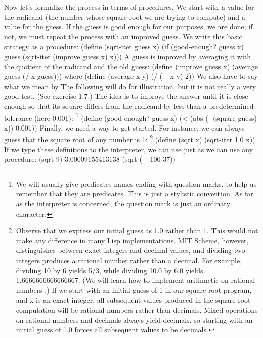 Now let's formalize the process in terms of procedures.
We start with a value for the radicand
(the number whose square root we are trying to compute)
and a value for the guess.
If the guess is good enough for our purposes, we are done;
if not, we must repeat the process with an improved guess.
We write this basic strategy as a procedure:
\startcode
(define (sqrt-iter guess x)
  (if (good-enough? guess x)
      guess
      (sqrt-iter (improve guess x)
                 x)))
\stopcode
A guess is improved by averaging it with the quotient of the radicand and the old guess:
\startcode
(define (improve guess x)
  (average guess (/ x guess)))
\stopcode
where
\startcode
(define (average x y)
  (/ (+ x y) 2))
\stopcode
We also have to say what we mean by 
The following will do for illustration,
but it is not really a very good test.
(See exercise 1.7.)
The idea is to improve the answer until it is close enough
so that its square differs from the radicand by less than a predetermined tolerance (here 0.001):
\footnote{%
   We will usually give predicates names ending with question marks, to help us remember that they are predicates.
   This is just a stylistic convention.
   As far as the interpreter is concerned,   the question mark is just an ordinary character.
}
\startcode
(define (good-enough? guess x)
  (< (abs (- (square guess) x)) 0.001))
\stopcode
Finally, we need a way to get started. For instance, we can always guess that the square root of any number is 1:
\footnote{%
   Observe that we express our initial guess as 1.0 rather than 1.
   This would not make any difference in many Lisp implementations.
   MIT Scheme, however, distinguishes between exact integers and decimal values,
   and dividing two integers produces a rational number rather than a decimal.
   For example, dividing 10 by 6 yields 5/3, while dividing 10.0 by 6.0 yields 1.6666666666666667.
   (We will learn how to implement arithmetic on rational numbers .)
   If we start with an initial guess of 1 in our square-root program, and x is an exact integer,
   all subsequent values produced in the square-root computation will be rational numbers rather than decimals.
   Mixed operations on rational numbers and decimals always yield decimals,
   so starting with an initial guess of 1.0 forces all subsequent values to be decimals.
}
\startcode
(define (sqrt x)
  (sqrt-iter 1.0 x))
\stopcode
If we type these definitions to the interpreter, we can use  just as we can use any procedure:
\startcode
(sqrt 9)
3.00009155413138
(sqrt (+ 100 37))
